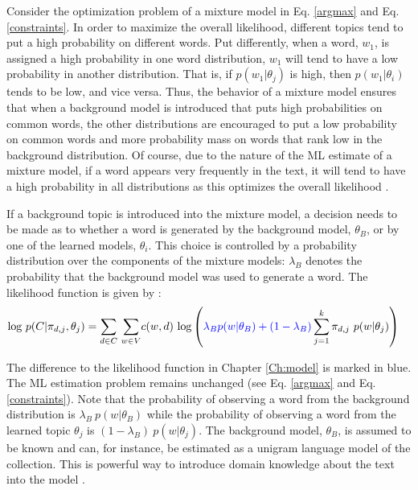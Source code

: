 \documentclass[11pt,a4paper,english,oneside]{book}
\numberwithin{equation}{chapter}
\begin{document}
Consider the optimization problem of a mixture model in Eq. \ref{argmax} and Eq. \ref{constraints}. In order to maximize the overall likelihood, different topics tend to put a high probability on different words. Put differently, when a word, $w_1$, is assigned a high probability in one word distribution, $w_1$ will tend to have a low probability in another distribution. That is, if $p(w_1|\theta_j)$ is high, then $p(w_1|\theta_i)$ tends to be low, and vice versa. Thus, the behavior of a mixture model ensures that when a background model is introduced that puts high probabilities on common words, the other distributions are encouraged to put a low probability on common words and more probability mass on words that rank low in the background distribution. Of course, due to the nature of the ML estimate of a mixture model, if a word appears very frequently in the text, it will tend to have a high probability in all distributions as this optimizes the overall likelihood \citep[pp. 353--359]{Zhai.2016}.

If a background topic is introduced into the mixture model, a decision needs to be made as to whether a word is generated by the background model, $\theta_B$, or by one of the learned models, $\theta_i$. This choice is controlled by a probability distribution over the components of the mixture models: $\lambda_B$ denotes the probability that the background model was used to generate a word. The likelihood function is given by \citep[p. 372]{Zhai.2016}:
\begin{align}
\label{BLL} \text{log} \ p(C|\pi_{d,j},\theta_j) &= \underset{d \in C}{\sum} \ \underset{w \in V}\sum c(w,d) \ \text{log} \left( \textcolor{blue}{\lambda_B p(w|\theta_B) + (1-\lambda_B)} \sum_{j=1}^{k}\pi_{d,j} \ p(w|\theta_j) \right)
\end{align}

The difference to the likelihood function in Chapter \ref{Ch:model} is marked in blue. The ML estimation problem remains unchanged (see Eq. \ref{argmax} and Eq. \ref{constraints}). Note that the probability of observing a word from the background distribution is $\lambda_B \ p(w|\theta_B)$ while the probability of observing a word from the learned topic $\theta_j$ is $(1-\lambda_B) \ p(w|\theta_j)$. The background model, $\theta_B$, is assumed to be known and can, for instance, be estimated as a unigram language model of the collection. This is powerful way to introduce domain knowledge about the text into the model \citep[pp. 352, 372--376]{Zhai.2016}. 
\end{document}
